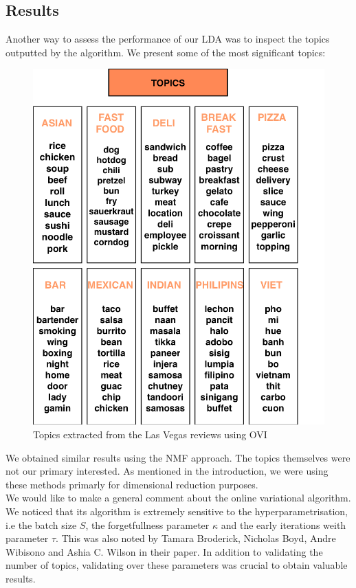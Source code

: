 \documentclass[twoside]{article}
\begin{document}
\begin{multicols}{2}
\subsection{Results}
Another way to assess the performance of our LDA was to inspect the topics outputted by the algorithm. We present some of the most significant topics:\\

\begin{figure}[H]
\centering
\includegraphics[width=1\linewidth]{img/topics.png}
\caption{Topics extracted from the Las Vegas reviews using OVI}
\end{figure} 

\noindent We obtained similar results using the NMF approach. The topics themselves were not our primary interested. As mentioned in the introduction, we were using these methods primarly for dimensional reduction purposes. \\

We would like to make a general comment about the online variational algorithm. We noticed that its algorithm is extremely sensitive to the hyperparametrisation, i.e the batch size $S$, the forgetfullness parameter $\kappa$ and the early iterations weith parameter $\tau$. This was also noted by Tamara Broderick, Nicholas Boyd, Andre Wibisono and Ashia C. Wilson in their paper\cite{svi}. In addition to validating the number of topics, validating over these parameters was crucial to obtain valuable results.\\


\end{multicols}
\end{document}
